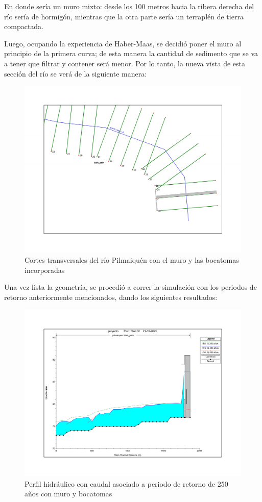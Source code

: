 \documentclass{article} %
\begin{document}
En donde sería un muro mixto: desde los 100 metros hacia la ribera derecha del río sería de hormigón, mientras que la otra parte sería un terraplén de tierra compactada.

Luego, ocupando la experiencia de Haber-Maas, se decidió poner el muro al principio de la primera curva; de esta manera la cantidad de sedimento que se va a tener que filtrar y contener será menor. Por lo tanto, la nueva vista de esta sección del río se verá de la siguiente manera:

\begin{figure}[H]
    \centering
    \includegraphics[width=0.6\linewidth]{imagenes/rio.pdf}
    \caption{Cortes transversales del río Pilmaiquén con el muro y las bocatomas incorporadas}
\end{figure}

Una vez lista la geometría, se procedió a correr la simulación con los periodos de retorno anteriormente mencionados, dando los siguientes resultados:

\begin{figure}[H]
    \centering
    \includegraphics[width=0.6\linewidth]{imagenes/perfil_250_cb.pdf}
    \caption{Perfil hidráulico con caudal asociado a periodo de retorno de 250 años con muro y bocatomas}
\end{figure}
\end{document}

